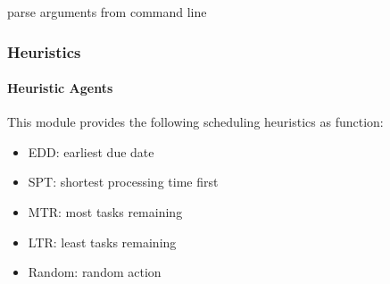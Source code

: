 \documentclass[letterpaper,10pt,english]{sphinxmanual}
\begin{document}

\begin{fulllineitems}
\label{\detokenize{agents.solver:agents.solver.solver.get_perser_args}}
\sphinxAtStartPar
parse arguments from command line

\end{fulllineitems}


\begin{fulllineitems}
\label{\detokenize{agents.solver:agents.solver.solver.main}}
\end{fulllineitems}



\subsubsection{Heuristics}
\label{\detokenize{agents.heuristic:heuristics}}\label{\detokenize{agents.heuristic::doc}}

\paragraph{Heuristic Agents}
\label{\detokenize{agents.heuristic:module-agents.heuristic.heuristic_agent}}\label{\detokenize{agents.heuristic:heuristic-agents}}
\sphinxAtStartPar
This module provides the following scheduling heuristics as function:
\begin{itemize}
\item {} 
\sphinxAtStartPar
EDD: earliest due date

\item {} 
\sphinxAtStartPar
SPT: shortest processing time first

\item {} 
\sphinxAtStartPar
MTR: most tasks remaining

\item {} 
\sphinxAtStartPar
LTR: least tasks remaining

\item {} 
\sphinxAtStartPar
Random: random action

\end{itemize}
\end{document}
